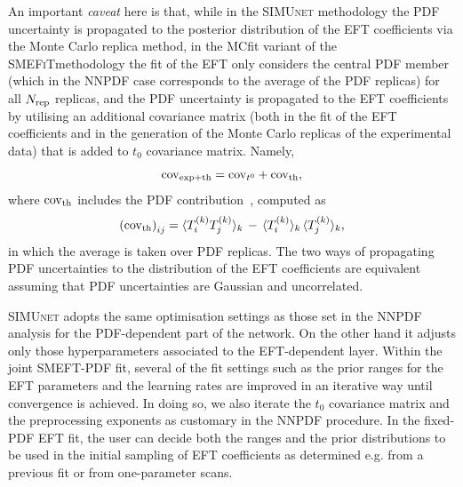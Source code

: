 \documentclass[withindex,glossary]{cam-thesis}
\newcommand{\simunet}{\textsc{SIMUnet}}
\newcommand{\smefit}{\textsc{SMEFiT}}
\newcommand{\JM}[1]{{\bf\color{cyan}JM: #1}}
\begin{document}
 An important {\it caveat} here is that, while in the \simunet{}
 methodology the PDF uncertainty is propagated to the posterior
 distribution of the EFT coefficients via the Monte Carlo replica
 method, in the MCfit variant of the \smefit methodology the fit of
 the EFT only considers the central PDF member (which in the NNPDF
 case corresponds to the average of the PDF replicas) for all $N_{\rm rep}$
 replicas, and the PDF uncertainty is propagated to the EFT
 coefficients by utilising an additional covariance matrix (both in the fit of the EFT
 coefficients and in the generation of the Monte Carlo replicas of the
 experimental data) that is added to $t_0$ covariance matrix. Namely, 
 \begin{equation} \label{eq:expthcov}
{\rm cov}_{\rm exp+th} = {\rm cov}_{t^0} + {\rm cov}_{\rm th},
\end{equation}
where ${\rm cov}_{\rm th}$ 
includes the PDF contribution~\cite{Ethier:2021bye,Hartland:2019bjb}, computed as
\begin{equation}
\left( {\rm cov}_{\rm th}\right)_{ij} = \langle T_i^{(k)}T_j^{(k)}\rangle_k
\,-\, \langle T_i^{(k)}\rangle_k \, \langle T_j^{(k)}\rangle_k,
  \end{equation}
in which the average is taken over PDF replicas. The two ways of
propagating PDF uncertainties to the distribution of the EFT
coefficients are equivalent assuming that PDF uncertainties are Gaussian and uncorrelated. 
 
 \simunet{} adopts the same optimisation settings as those set in the
 NNPDF analysis for the PDF-dependent
 part of the network. On the other hand it adjusts only those hyperparameters
 associated to the EFT-dependent layer.
 Within the joint SMEFT-PDF fit, several of the fit settings
 such as the prior ranges for the EFT parameters and the learning rates are improved
 in an iterative way until convergence is achieved.
 In doing so, we also iterate the $t_0$ covariance matrix and the preprocessing
 exponents as customary in the NNPDF procedure.
 In the fixed-PDF EFT fit, the user can decide
 both the ranges and the prior distributions to be used in the initial
 sampling of EFT coefficients as determined e.g. from a previous
 fit or from one-parameter scans.
 
\end{document}
